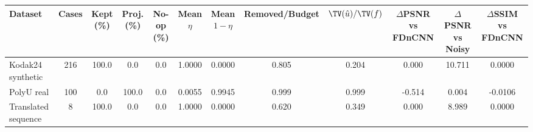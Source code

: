 \begin{tabular}{lccccccccccc}
\toprule
Dataset & Cases & Kept (\%) & Proj. (\%) & No-op (\%) & Mean $\eta$ & Mean $1-\eta$ & Removed/Budget & $\TV(\hat u)/\TV(f)$ & $\Delta$PSNR vs FDnCNN & $\Delta$PSNR vs Noisy & $\Delta$SSIM vs FDnCNN \\
\midrule
Kodak24 synthetic & 216 & 100.0 & 0.0 & 0.0 & 1.0000 & 0.0000 & 0.805 & 0.204 & 0.000 & 10.711 & 0.0000 \\
PolyU real & 100 & 0.0 & 100.0 & 0.0 & 0.0055 & 0.9945 & 0.999 & 0.999 & -0.514 & 0.004 & -0.0106 \\
Translated sequence & 8 & 100.0 & 0.0 & 0.0 & 1.0000 & 0.0000 & 0.620 & 0.349 & 0.000 & 8.989 & 0.0000 \\
\bottomrule
\end{tabular}
